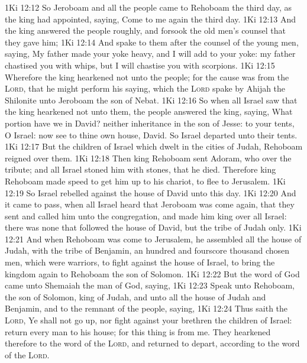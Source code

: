 \vs 1Ki 12:12 So Jeroboam and all the people came to Rehoboam the third day, as the king had appointed, saying, Come to me again the third day.
\vs 1Ki 12:13 And the king answered the people roughly, and forsook the old men's counsel that they gave him;
\vs 1Ki 12:14 And spake to them after the counsel of the young men, saying, My father made your yoke heavy, and I will add to your yoke: my father  chastised you with whips, but I will chastise you with scorpions.
\vs 1Ki 12:15 Wherefore the king hearkened not unto the people; for the cause was from the \textsc{Lord}, that he might perform his saying, which the \textsc{Lord} spake by Ahijah the Shilonite unto Jeroboam the son of Nebat.
\vs 1Ki 12:16 So when all Israel saw that the king hearkened not unto them, the people answered the king, saying, What portion have we in David? neither  inheritance in the son of Jesse: to your tents, O Israel: now see to thine own house, David. So Israel departed unto their tents.
\vs 1Ki 12:17 But  the children of Israel which dwelt in the cities of Judah, Rehoboam reigned over them.
\vs 1Ki 12:18 Then king Rehoboam sent Adoram, who  over the tribute; and all Israel stoned him with stones, that he died. Therefore king Rehoboam made speed to get him up to his chariot, to flee to Jerusalem.
\vs 1Ki 12:19 So Israel rebelled against the house of David unto this day.
\vs 1Ki 12:20 And it came to pass, when all Israel heard that Jeroboam was come again, that they sent and called him unto the congregation, and made him king over all Israel: there was none that followed the house of David, but the tribe of Judah only.
\vs 1Ki 12:21 And when Rehoboam was come to Jerusalem, he assembled all the house of Judah, with the tribe of Benjamin, an hundred and fourscore thousand chosen men, which were warriors, to fight against the house of Israel, to bring the kingdom again to Rehoboam the son of Solomon.
\vs 1Ki 12:22 But the word of God came unto Shemaiah the man of God, saying,
\vs 1Ki 12:23 Speak unto Rehoboam, the son of Solomon, king of Judah, and unto all the house of Judah and Benjamin, and to the remnant of the people, saying,
\vs 1Ki 12:24 Thus saith the \textsc{Lord}, Ye shall not go up, nor fight against your brethren the children of Israel: return every man to his house; for this thing is from me. They hearkened therefore to the word of the \textsc{Lord}, and returned to depart, according to the word of the \textsc{Lord}.
